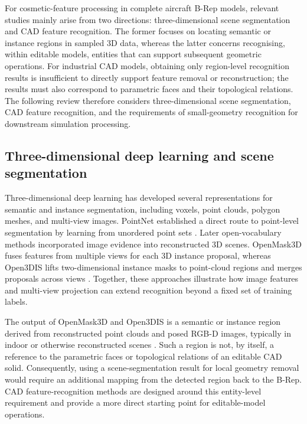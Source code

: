 \documentclass[12pt,a4paper]{article}
\begin{document}
For cosmetic-feature processing in complete aircraft B-Rep models, relevant studies mainly arise from two directions: three-dimensional scene segmentation and CAD feature recognition. The former focuses on locating semantic or instance regions in sampled 3D data, whereas the latter concerns recognising, within editable models, entities that can support subsequent geometric operations. For industrial CAD models, obtaining only region-level recognition results is insufficient to directly support feature removal or reconstruction; the results must also correspond to parametric faces and their topological relations. The following review therefore considers three-dimensional scene segmentation, CAD feature recognition, and the requirements of small-geometry recognition for downstream simulation processing.

\subsection{Three-dimensional deep learning and scene segmentation}

Three-dimensional deep learning has developed several representations for semantic and instance segmentation, including voxels, point clouds, polygon meshes, and multi-view images. PointNet established a direct route to point-level segmentation by learning from unordered point sets \parencite{qi2017pointnet}. Later open-vocabulary methods incorporated image evidence into reconstructed 3D scenes. OpenMask3D fuses features from multiple views for each 3D instance proposal, whereas Open3DIS lifts two-dimensional instance masks to point-cloud regions and merges proposals across views \parencite{takmaz2023openmask3d,nguyen2024open3dis}. Together, these approaches illustrate how image features and multi-view projection can extend recognition beyond a fixed set of training labels.

The output of OpenMask3D and Open3DIS is a semantic or instance region derived from reconstructed point clouds and posed RGB-D images, typically in indoor or otherwise reconstructed scenes \parencite{takmaz2023openmask3d,nguyen2024open3dis}. Such a region is not, by itself, a reference to the parametric faces or topological relations of an editable CAD solid. Consequently, using a scene-segmentation result for local geometry removal would require an additional mapping from the detected region back to the B-Rep. CAD feature-recognition methods are designed around this entity-level requirement and provide a more direct starting point for editable-model operations.
\end{document}
